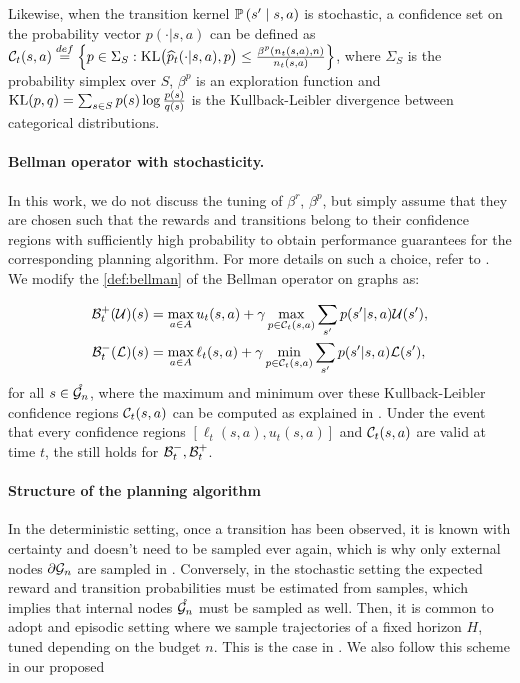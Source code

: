 \documentclass[runningheads]{llncs}
\begin{document}
Likewise, when the transition kernel $\mathbb{P}\left(s' \;\middle|\; s,a\right)$ is stochastic, a confidence set on the probability vector $p(\cdot|s,a)$ can be defined as
$\mathcal{C}_t(s,a) \stackrel{def}{=} \left\{p\in \Sigma_S :  \operatorname{KL}\!\big(\widehat{p}_t(\cdot|s,a),p\big) \leq \frac {\beta^p(n_t(s,a), n)} {n_t(s,a)}\right\}$,
where $\Sigma_S$ is the probability simplex over $S$, $\beta^p$ is an exploration function and $\operatorname{KL}(p,q)= \sum_{s \in S}  p(s) \log \tfrac{ p(s)} {{q}(s)}$ is the Kullback-Leibler divergence between categorical distributions.

\paragraph{Bellman operator with stochasticity.}

In this work, we do not discuss the tuning of $\beta^r$, $\beta^p$, but simply assume that they are chosen such that the rewards and transitions belong to their confidence regions with sufficiently high probability to obtain performance guarantees for the corresponding planning algorithm. For more details on such a choice, refer to \citep[e.g.][]{Leurent2019practical, MDPGapE2020}. We modify the \cref{def:bellman} of the Bellman operator on graphs as:

\begin{align*}
\mathcal{B}_t^+(\mathcal{U})(s) &= \max_{a\in A} u_t(s,a) + \gamma \max_{p \in \mathcal{C}_t(s,a)} \sum_{s'} p(s'|s,a) \mathcal{U}(s'), \\
\mathcal{B}_t^-(\mathcal{L})(s) &= \max_{a\in A} \ell_t(s,a) + \gamma \min_{p \in \mathcal{C}_t(s,a)} \sum_{s'} p(s'|s,a)\mathcal{L}(s'),
\end{align*}
for all $s\in\mathring{\mathcal{G}_n}$, where the maximum and minimum over these Kullback-Leibler confidence regions $\mathcal{C}_t(s,a)$ can be computed as explained in \citep[Appendix A of][]{Filippi2010optimism}. Under the event that every confidence regions $[\ell_t(s,a), u_t(s,a)]$ and $\mathcal{C}_t(s,a)$ are valid at time $t$, the  still holds for $\mathcal{B}_t^-, \mathcal{B}_t^+$.

\paragraph{Structure of the planning algorithm}

In the deterministic setting, once a transition has been observed, it is known with certainty and doesn't need to be sampled ever again, which is why only external nodes ${\partial \mathcal{G}_n}$ are sampled in \GBOPD. Conversely, in the stochastic setting the expected reward and transition probabilities must be estimated from samples, which implies that internal nodes $\mathring{\mathcal{G}_n}$ must be sampled as well. Then, it is common to adopt and episodic setting where we sample trajectories of a fixed horizon $H$, tuned depending on the budget $n$. This is the case in  \citep[e.g.][]{Kearns02SS,Kocsis06UCT,Bubeck2010open,Feldman14BRUE,Leurent2019practical,MDPGapE2020}. We also follow this scheme in our proposed \GBOP
\end{document}
